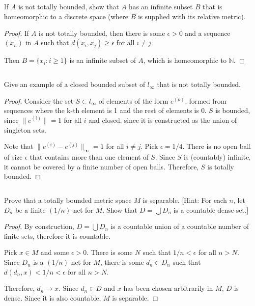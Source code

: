 
\subsection{} If $A$ is not totally bounded, show that $A$ has an infinite subset $B$ that is homeomorphic to a discrete space (where $B$ is supplied with its relative metric).

\begin{proof}
If $A$ is not totally bounded, then there is some $\epsilon > 0$ and a sequence $(x_n)$ in $A$ such that $d(x_i, x_j) \geq \epsilon$ for all $i \neq j$.

Then $B = \{x_i: i \geq 1\}$ is an infinite subset of $A$, which is homeomorphic to $\mathbb{N}$.

\end{proof}


\subsection{} Give an example of  a  closed  bounded subset of $l_\infty$ that is  not  totally bounded. 

\begin{proof}
Consider the set $S \subset l_\infty$ of elements of the form $e^{(k)}$, formed from sequences where the k-th element is 1 and the rest of elements is 0. $S$ is bounded, since $\|e^{(i)}\| = 1$ for all $i$ and closed, since it is constructed as the union of singleton sets.

Note that $\|e^{(i)} - e^{(j)}\|_\infty = 1$ for all $i \neq j$. Pick $\epsilon = 1/4$. There is no open ball of size $\epsilon$ that contains more than one element of $S$. Since $S$ is (countably) infinite, it cannot be covered by a finite number of open balls. Therefore, $S$ is totally bounded.

\end{proof}

\subsection{} Prove that a totally bounded metric space $M$ is separable. [Hint: For each $n$, let $D_n$ be a finite $(1/n)$-net for $M$. Show that $D = \bigcup D_n$ is a countable dense set.]

\begin{proof}
By construction, $D = \bigcup D_n$ is a countable union of a countable number of finite sets, therefore it is countable.

Pick $x \in M$ and some $\epsilon > 0$. There is some $N$ such that $1/n < \epsilon$ for all $n > N$. Since $D_n$ is a $(1/n)$-net for $M$, there is some $d_n \in D_n$ such that $d(d_n, x) < 1/n < \epsilon$ for all $n >N$.

Therefore, $d_n \rightarrow x$. Since $d_n \in D$ and $x$ has been chosen arbitrarily in $M$, $D$ is dense. Since it is also countable, $M$ is separable.

\end{proof}

